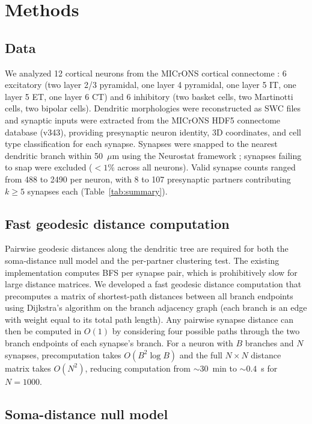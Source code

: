\section{Methods}

\subsection{Data}

We analyzed 12 cortical neurons from the MICrONS cortical connectome \citep{microns}: 6 excitatory (two layer 2/3 pyramidal, one layer 4 pyramidal, one layer 5 IT, one layer 5 ET, one layer 6 CT) and 6 inhibitory (two basket cells, two Martinotti cells, two bipolar cells). Dendritic morphologies were reconstructed as SWC files and synaptic inputs were extracted from the MICrONS HDF5 connectome database (v343), providing presynaptic neuron identity, 3D coordinates, and cell type classification for each synapse. Synapses were snapped to the nearest dendritic branch within 50~$\mu$m using the Neurostat framework \citep{neurostat}; synapses failing to snap were excluded ($< 1\%$ across all neurons). Valid synapse counts ranged from 488 to 2490 per neuron, with 8 to 107 presynaptic partners contributing $k \geq 5$ synapses each (Table~\ref{tab:summary}).

\subsection{Fast geodesic distance computation}

Pairwise geodesic distances along the dendritic tree are required for both the soma-distance null model and the per-partner clustering test. The existing implementation computes BFS per synapse pair, which is prohibitively slow for large distance matrices. We developed a fast geodesic distance computation that precomputes a matrix of shortest-path distances between all branch endpoints using Dijkstra's algorithm on the branch adjacency graph (each branch is an edge with weight equal to its total path length). Any pairwise synapse distance can then be computed in $O(1)$ by considering four possible paths through the two branch endpoints of each synapse's branch. For a neuron with $B$ branches and $N$ synapses, precomputation takes $O(B^2 \log B)$ and the full $N \times N$ distance matrix takes $O(N^2)$, reducing computation from ${\sim}30$~min to ${\sim}0.4$~s for $N = 1000$.

\subsection{Soma-distance null model}

